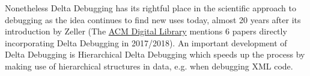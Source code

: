 \documentclass[a4paper,UKenglish]{lipics-v2018}
\begin{document}
Nonetheless Delta Debugging has its rightful place in the scientific approach to debugging as the idea continues to find new uses today, almost 20 years after its introduction by Zeller (The \href{https://dl.acm.org/dl.cfm}{ACM Digital Library} mentions 6 papers directly incorporating Delta Debugging in 2017/2018). An important development of Delta Debugging is Hierarchical Delta Debugging \cite{Misherghi:2006:HHD:1134285.1134307} which speeds up the process by making use of hierarchical structures in data, e.g. when debugging XML code.


\end{document}
